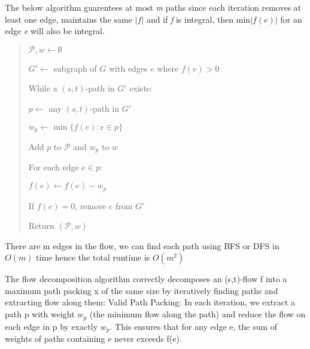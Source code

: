 \documentclass{article}
\begin{document}
\begin{solution} The below algorithm guarentees at most \textit{m} paths since each iteration removes at least one edge, maintains the same $|f|$ and if \textit{f} is integral, then min$|f(e)|$ for an edge \textit{e} will also be integral.


\begin{quote}%

\begin{steps}

    \item $\mathcal{P},w \leftarrow \emptyset$
    \item $G' \leftarrow$ subgraph of $G$ with edges $e$ where $f(e) > 0$
    \item While a $(s,t)$-path in $G'$ exists:
    \begin{steps}
    \item $p \leftarrow$ any $(s,t)$-path  in $G'$ 
    \item $w_p  \leftarrow  \min\{f(e) : e \in p\}$
    \item Add $p$ to $\mathcal{P}$ and $w_p$ to $w$
    \item For each edge $e \in p$:
        \begin{steps}
        \item $f(e) \leftarrow f(e) - w_p$
        \item If $f(e) = 0$, remove $e$ from $G'$
        \end{steps}
    \end{steps}
    \item Return $(\mathcal{P}, w)$


    \end{steps}

\end{quote}

\begin{subproof}[Runtime]
There are m edges in the flow, we can find each path using BFS or DFS in $O(m)$ time hence the total runtime is $O(m^2)$
\end{subproof}
\begin{subproof}[Correctness]
The flow decomposition algorithm correctly decomposes an (s,t)-flow f into a maximum path packing x of the same size by iteratively finding paths and extracting flow along them:
Valid Path Packing: In each iteration, we extract a path p with weight $w_p$ (the minimum flow along the path) and reduce the flow on each edge in p by exactly $w_p$. This ensures that for any edge e, the sum of weights of paths containing e never exceeds f(e).


\end{subproof}
\end{solution}
\end{document}
